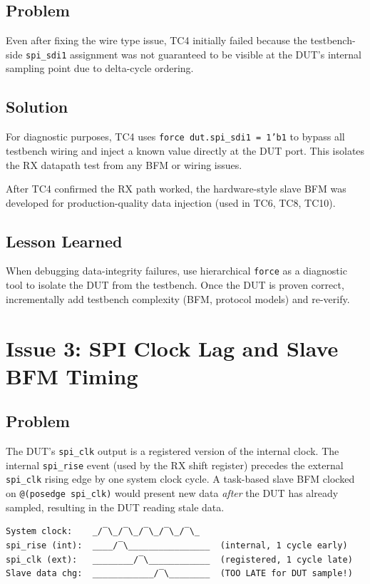 \subsection{Problem}

Even after fixing the wire type issue, TC4 initially failed because the testbench-side
\texttt{spi\_sdi1} assignment was not guaranteed to be visible at the DUT's internal sampling
point due to delta-cycle ordering.

\subsection{Solution}

For diagnostic purposes, TC4 uses \texttt{force dut.spi\_sdi1 = 1'b1} to bypass all testbench
wiring and inject a known value directly at the DUT port. This isolates the RX datapath test
from any BFM or wiring issues.

After TC4 confirmed the RX path worked, the hardware-style slave BFM was developed for
production-quality data injection (used in TC6, TC8, TC10).

\subsection{Lesson Learned}

When debugging data-integrity failures, use hierarchical \texttt{force} as a diagnostic tool
to isolate the DUT from the testbench. Once the DUT is proven correct, incrementally add
testbench complexity (BFM, protocol models) and re-verify.

\section{Issue 3: SPI Clock Lag and Slave BFM Timing}

\subsection{Problem}

The DUT's \texttt{spi\_clk} output is a registered version of the internal clock. The internal
\texttt{spi\_rise} event (used by the RX shift register) precedes the external \texttt{spi\_clk}
rising edge by one system clock cycle. A task-based slave BFM clocked on
\texttt{@(posedge spi\_clk)} would present new data \emph{after} the DUT has already sampled,
resulting in the DUT reading stale data.

\begin{verbatim}
System clock:    _/‾\_/‾\_/‾\_/‾\_/‾\_
spi_rise (int):  ____/‾\________________  (internal, 1 cycle early)
spi_clk (ext):   ________/‾\____________  (registered, 1 cycle late)
Slave data chg:  ____________/‾\________  (TOO LATE for DUT sample!)
\end{verbatim}

